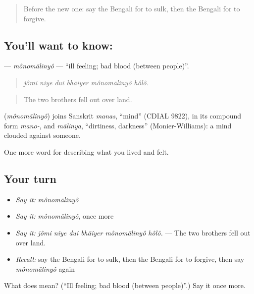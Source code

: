 \label{lesson:BN-C444-monomalinyo}



\begin{quote}
Before the new one: say the Bengali for to sulk, then the Bengali for to forgive.
\end{quote}

\subsection*{You'll want to know: }
\textbf{} — \emph{mônomālinyô} — \textquotedblleft{}ill feeling; bad blood (between people)\textquotedblright{}.

\begin{quote}
     
\end{quote}

\begin{quote}
\emph{jômi niye dui bhāiyer mônomālinyô hôlô.}
\end{quote}

\begin{quote}
The two brothers fell out over land.
\end{quote}

\begin{cousinweb}
\textbf{} (\emph{mônomālinyô}) joins Sanskrit \emph{manas}, \textquotedblleft{}mind\textquotedblright{} (CDIAL 9822), in its compound form \emph{mano-}, and \emph{mālinya}, \textquotedblleft{}dirtiness, darkness\textquotedblright{} (Monier-Williams): a mind clouded against someone.
\end{cousinweb}

\begin{grammarlens}[title={What you've built}]
One more word for describing what you lived and felt.
\end{grammarlens}

\subsection*{Your turn}
\begin{itemize}
\raggedright
  \item \emph{Say it:} \emph{mônomālinyô}
  \item \emph{Say it:} \emph{mônomālinyô}, once more
  \item \emph{Say it:} \emph{jômi niye dui bhāiyer mônomālinyô hôlô.} — The two brothers fell out over land.
  \item \emph{Recall:} say the Bengali for to sulk, then the Bengali for to forgive, then say \emph{mônomālinyô} again
\end{itemize}

\begin{tcolorbox}[breakable,colback=teal!4,colframe=teal!35!black,title={Before you move on}]
What does  mean? (\textquotedblleft{}Ill feeling; bad blood (between people)\textquotedblright{}.) Say it once more.
\end{tcolorbox}

